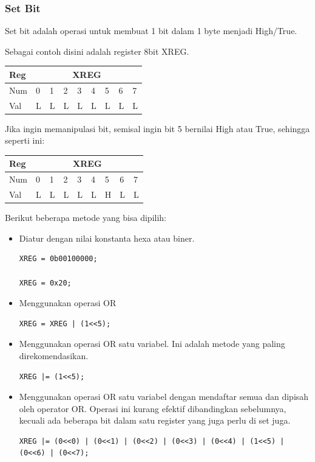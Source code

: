 \documentclass[12pt,]{article}
\begin{document}
	\subsubsection{Set Bit}
	
	Set bit adalah operasi untuk membuat 1 bit dalam 1 byte menjadi High/True.
	
	Sebagai contoh disini adalah register 8bit XREG.
	
	\begin{table}[H]
		\begin{tabular}{|l|l|l|l|l|l|l|l|l|}
			\hline
			Reg & \multicolumn{8}{c|}{XREG}     \\ \hline
			Num & 0 & 1 & 2 & 3 & 4 & 5 & 6 & 7 \\ \hline
			Val & L & L & L & L & L & L & L & L \\ \hline
		\end{tabular}
	\end{table}

	
	Jika ingin memanipulasi bit, semisal ingin bit 5 bernilai High atau True, sehingga seperti ini:
	\begin{table}[H]
		\begin{tabular}{|l|l|l|l|l|l|l|l|l|}
			\hline
			Reg & \multicolumn{8}{c|}{XREG}     \\ \hline
			Num & 0 & 1 & 2 & 3 & 4 & 5 & 6 & 7 \\ \hline
			Val & L & L & L & L & L & H & L & L \\ \hline
		\end{tabular}
	\end{table}
	
	Berikut beberapa metode yang bisa dipilih:
	\begin{itemize}
		\item Diatur dengan nilai konstanta hexa atau biner.
		\begin{verbatim}
XREG = 0b00100000;

XREG = 0x20;
		\end{verbatim}
		
		\item Menggunakan operasi OR
		\begin{verbatim}
XREG = XREG | (1<<5);
		\end{verbatim}
		
		\item Menggunakan operasi OR satu variabel.
		Ini adalah metode yang paling direkomendasikan.
		\begin{verbatim}
XREG |= (1<<5);
		\end{verbatim}
		
		\item Menggunakan operasi OR satu variabel dengan mendaftar semua dan dipisah oleh operator OR.
		Operasi ini kurang efektif dibandingkan sebelumnya,
		kecuali ada beberapa bit dalam satu register yang juga perlu di set juga.
		\begin{verbatim}
XREG |= (0<<0) | (0<<1) | (0<<2) | (0<<3) | (0<<4) | (1<<5) | (0<<6) | (0<<7);
		\end{verbatim}
	\end{itemize}
	
\end{document}
